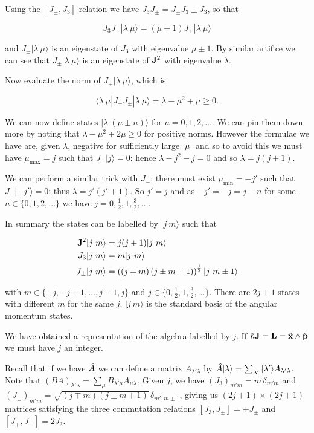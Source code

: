 \documentclass{notes}
\newcommand{\bra}[1]{\langle#1|}
\newcommand{\ket}[1]{|#1\rangle}
\newcommand{\com}[2]{\left[#1,#2\right]}
\begin{document}
Using the $\com{J_\pm}{J_3}$ relation we have
$J_3 J_\pm = J_\pm J_3 \pm J_3$, so that

\[
J_3 J_\pm \ket{\lambda\ \mu} = \left( \mu \pm 1\right) J_\pm
\ket{\lambda\ \mu}
\]

and $J_\pm \ket{\lambda\ \mu}$ is an eigenstate of $J_3$ with
eigenvalue $\mu \pm 1$.  By similar artifice we can see that $J_\pm
\ket{\lambda\ \mu}$ is an eigenstate of $\mathbf{J}^2$ with eigenvalue
$\lambda$.

Now evaluate the norm of $J_\pm \ket{\lambda\ \mu}$, which is

\[
\bra{\lambda\ \mu}J_\mp J_\pm \ket{\lambda\ \mu}
= \lambda - \mu^2 \mp \mu \ge 0.
\]

We can now define states $\ket{\lambda\ \left(\mu \pm n\right)}$ for
$n= 0,1,2,\dots$.  We can pin them down more by noting that $ \lambda
- \mu^2 \mp 2 \mu \ge 0$ for positive norms.  However the formulae we
have are, given $\lambda$, negative for sufficiently large $\left|\mu\right|$
and so to avoid this we must have $\mu_{\text{max}} = j$ such that
$J_+ \ket{j} = 0$: hence $\lambda - j^2 - j = 0$ and so $\lambda = j
(j+1)$.

We can perform a similar trick with $J_-$; there must exist
$\mu_{\text{min}} = - j'$ such that $J_- \ket{-j'} = 0$: thus $\lambda
= j' (j' + 1)$.  So $j' = j$ and as $-j' = -j = j - n$ for some
$n \in \{0,1,2,\dots\}$ we have $j = 0,\frac{1}{2},1,\frac{3}{2},\dots$.

In summary the states can be labelled by $\ket{j\ m}$ such that

\begin{align*}
\vect{J}^2 \ket{j\ m} &= j(j+1) \ket{j\ m} \\
J_3 \ket{j\ m} &= m \ket{j\ m} \\
J_\pm \ket{j\ m} &= \left(
\left( j \mp m \right) \left( j \pm m + 1 \right) \right)^{\frac{1}{2}}
\ket{j\ m \pm 1}
\end{align*}

with $m \in \{ -j, -j + 1,\dots, j-1, j \}$ and $j \in \{0, \frac{1}{2},
1, \frac{3}{2},\dots \}$.  There are $2 j + 1$ states with different $m$
for the same $j$.  $\ket{j\ m}$ is the standard basis of the angular
momentum states.

We have obtained a representation of the algebra labelled by $j$.  If
$\hbar \mathbf{J} = \mathbf{L} = \Hat{\mathbf{x}} \wedge \Hat{\mathbf{p}}$ we
must have $j$ an integer.

Recall that if we have $\Hat{A}$ we can define a
matrix $A_{\lambda' \lambda}$ by ${\Hat{A} \ket{\lambda} =
\sum_{\lambda'} \ket{\lambda'} A_{\lambda' \lambda}}$.  Note that
$\left( B A \right)_{\lambda' \lambda} = \sum_\mu B_{\lambda' \mu}
A_{\mu \lambda}$.  Given $j$, we have
$\left(J_3\right)_{m' m} = m\, \delta_{m' m}$ and
$\left( J_\pm \right)_{m' m} = \sqrt{\left( j \mp m
\right) \left( j \pm m + 1 \right)}\, \delta_{m',m\pm 1}$, giving us
$\left( 2 j + 1 \right) \times \left( 2 j + 1 \right)$ matrices satisfying
the three commutation relations $\com{J_3}{J_\pm} = \pm J_\pm$
and $\com{J_+}{J_-} = 2 J_3$.
\end{document}
